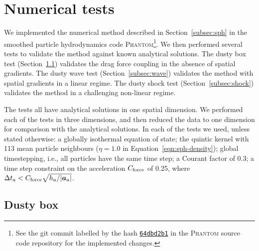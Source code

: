 \documentclass[fleqn,usenatbib]{mnras}
\let\vec\bm
\begin{document}
\section{Numerical tests}%
\label{sec:tests}

We implemented the numerical method described in Section~\ref{subsec:sph} in the
smoothed particle hydrodynamics code \textsc{Phantom}\footnote{See the git
commit labelled by the hash
\href{https://github.com/danieljprice/phantom/commit/64dbd2b124ca74051eed920d6cad0a2e83157478}{\texttt{64dbd2b1}}
in the \textsc{Phantom} source code repository for the implemented changes.}. We
then performed several tests to validate the method against known analytical
solutions. The dusty box test (Section~\ref{subsec:box}) validates the drag
force coupling in the absence of spatial gradients. The dusty wave test
(Section~\ref{subsec:wave}) validates the method with spatial gradients in a
linear regime. The dusty shock test (Section~\ref{subsec:shock}) validates the
method in a challenging non-linear regime.

The tests all have analytical solutions in one spatial dimension. We performed
each of the tests in three dimensions, and then reduced the data to one
dimension for comparison with the analytical solutions. In each of the tests we
used, unless stated otherwise: a globally isothermal equation of state; the
quintic kernel with 113 mean particle neighbours (\(\eta = 1.0\) in
Equation~\ref{eqn:sph-density}); global timestepping, i.e., all particles have
the same time step; a Courant factor of 0.3; a time step constraint on the
acceleration \( C_{\rm force} \) of 0.25, where \(\Delta t_a < C_{\rm force}
\sqrt{h_a / |\vec{a}_a|} \).


\subsection{Dusty box}%
\label{subsec:box}
\end{document}
